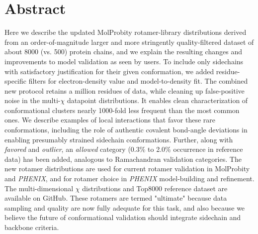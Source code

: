 \section{Abstract}

Here we describe the updated MolProbity rotamer-library distributions derived from an order-of-magnitude larger and more stringently quality-filtered dataset of about 8000 (vs. 500) protein chains, and we explain the resulting changes and improvements to model validation as seen by users. To include only sidechains with satisfactory justification for their given conformation, we added residue-specific filters for electron-density value and model-to-density fit.  The combined new protocol retains a million residues of data, while cleaning up \textcolor{changecolor}{false-positive} noise in the multi-$\chi$ \textcolor{changecolor}{datapoint} distributions.  It enables clean characterization of conformational clusters nearly 1000-fold less frequent than the most common ones.  We describe examples of local interactions that favor these rare conformations, including the role of authentic covalent bond-angle deviations in enabling presumably strained sidechain conformations. Further, along with \textit{favored} and \textit{outlier}, an \textit{allowed} category (0.3\% to 2.0\% occurrence in reference data) has been added, analogous to Ramachandran validation categories. The new rotamer distributions are used for current rotamer validation in MolProbity and \textit{PHENIX}, and for rotamer choice in \textit{PHENIX} model-building and refinement. The multi-dimensional $\chi$ distributions and Top8000 reference dataset are available on GitHub. These rotamers are termed "ultimate" because data sampling and quality are now fully adequate for this task, and also because we believe the future of conformational validation should integrate sidechain and backbone \textcolor{changecolor}{criteria}.

